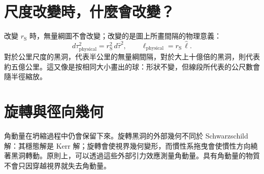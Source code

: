 \section{尺度改變時，什麼會改變？}

改變 \(r_{\mathrm S}\) 時，無量綱圖不會改變；改變的是圖上所畫間隔的物理意義：
\begin{equation}
d\tau_{\mathrm{physical}}^2
=
r_{\mathrm S}^2\,d\hat{\tau}^2,
\qquad
\ell_{\mathrm{physical}}
=
r_{\mathrm S}\,\hat{\ell}.
\label{eq:l7-scale-restoration}
\end{equation}
對於公里尺度的黑洞，代表半公里的無量綱間隔，對於大上十億倍的黑洞，則代表約五億公里。這又像是按相同大小畫出的球：形狀不變，但線段所代表的公尺數會隨半徑縮放。

\begin{classroomqa}
\end{classroomqa}

\begin{classroomqa}
\end{classroomqa}

\begin{classroomqa}
\end{classroomqa}

\section{旋轉與徑向幾何}

角動量在坍縮過程中仍會保留下來。旋轉黑洞的外部幾何不同於 Schwarzschild 解：其穩態解是 Kerr 解；旋轉會使視界幾何變形，而慣性系拖曳會使慣性方向繞著黑洞轉動。原則上，可以透過這些外部引力效應測量角動量。具有角動量的物質不會只因穿越視界就失去角動量。

